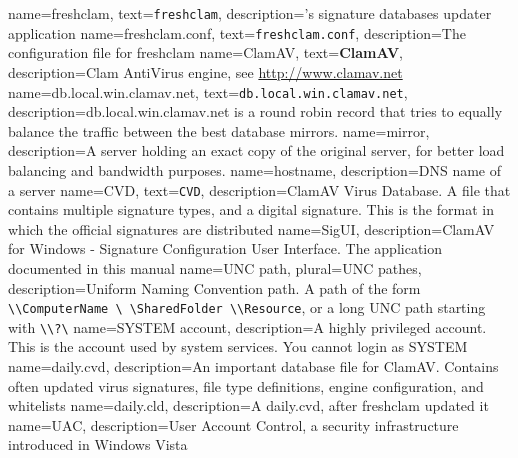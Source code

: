 {
    name={freshclam},
    text={\texttt{freshclam}},
    description={\ClamAV's signature databases updater application}
}
{
    name={freshclam.conf},
    text={\texttt{freshclam.conf}},
    description={The configuration file for \gls{freshclam}}
}
{
    name={ClamAV},
    text={\textbf{ClamAV}},
    description={Clam AntiVirus engine, see \url{http://www.clamav.net}}
}
{
    name={db.local.win.clamav.net},
    text={\texttt{db.local.win.clamav.net}},
    description={db.local.win.clamav.net is a round robin record that tries to
	equally balance the traffic between the best database mirrors.}
}
{
    name={mirror},
    description={A server holding an exact copy of the original server, for
	better load balancing and bandwidth purposes.}
}
{
    name={hostname},
    description={DNS name of a server}
}
{
    name={CVD},
    text={\texttt{CVD}},
    description={ClamAV Virus Database. A file that contains multiple signature types, and a digital signature.
	This is the format in which the official signatures are distributed}
}
{
    name={SigUI},
    description={ClamAV for Windows - Signature Configuration User Interface. The
	application documented in this manual}
}
{
    name={UNC path},
    plural={UNC pathes},
    description={Uniform Naming Convention path. A path of the form
	\texttt{\textbackslash\textbackslash ComputerName \textbackslash
	    \textbackslash SharedFolder \textbackslash\textbackslash Resource}, or a long UNC path
	    starting with \texttt{\textbackslash\textbackslash?\textbackslash}}
}
{
    name={SYSTEM account},
    description={A highly privileged account. This is the account used by system
	services. You cannot login as SYSTEM}
}
{
    name={daily.cvd},
    description={An important database file for \gls{ClamAV}. Contains often
	updated virus signatures, file type definitions, engine configuration,
	and whitelists}
}
{
    name={daily.cld},
    description={A \gls{daily.cvd}, after \gls{freshclam} updated it}
}
{
    name={UAC},
    description={User Account Control, a security infrastructure introduced in Windows Vista}
}
